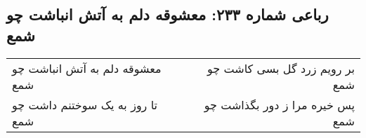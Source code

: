 \begin{center}
\section*{رباعی شماره ۲۳۳: معشوقه دلم به آتش انباشت چو شمع}
\label{sec:sh233}
\begin{longtable}{l p{0.5cm} r}
معشوقه دلم به آتش انباشت چو شمع
&&
بر رویم زرد گل بسی کاشت چو شمع
\\
تا روز به یک سوختنم داشت چو شمع
&&
پس خیره مرا ز دور بگذاشت چو شمع
\\
\end{longtable}
\end{center}
